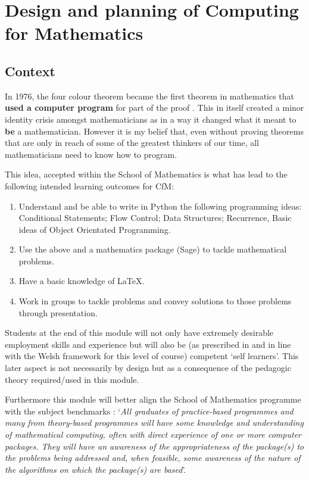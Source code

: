 \documentclass{article}
\begin{document}
\section{Design and planning of Computing for Mathematics}

\subsection{Context}

In 1976, the four colour theorem became the first theorem in mathematics that \textbf{used a computer program} for part of the proof \cite{fritsch_four-color_1998}. This in itself created a minor identity crisis amongst mathematicians as in a way it changed what it meant to \textbf{be} a mathematician. However it is my belief that, even without proving theorems that are only in reach of some of the greatest thinkers of our time, all mathematicians need to know how to program.

This idea, accepted within the School of Mathematics is what has lead to the following intended learning outcomes for CfM:

\begin{enumerate}
\item Understand and be able to write in Python the following programming ideas: Conditional Statements; Flow Control; Data Structures; Recurrence, Basic ideas of Object Orientated Programming.
\item Use the above and a mathematics package (Sage) to tackle mathematical problems.
\item Have a basic knowledge of LaTeX.
\item Work in groups to tackle problems and convey solutions to those problems through presentation.
\end{enumerate}

Students at the end of this module will not only have extremely desirable employment skills and experience but will also be (as prescribed in \cite{cardiff_university_way_2013} and in line with the Welsh framework for this level of course) competent `self learners'. This later aspect is not necessarily by design but as a consequence of the pedagogic theory required/used in this module.

Furthermore this module will better align the School of Mathematics programme with the subject benchmarks \cite{qaa_subject_2012}: `\textit{All graduates of practice-based programmes and many from theory-based programmes will have some knowledge and understanding of mathematical computing, often with direct experience of one or more computer packages. They will have an awareness of the appropriateness of the package(s) to the problems being addressed and, when feasible, some awareness of the nature of the algorithms on which the package(s) are based}'.
\end{document}
